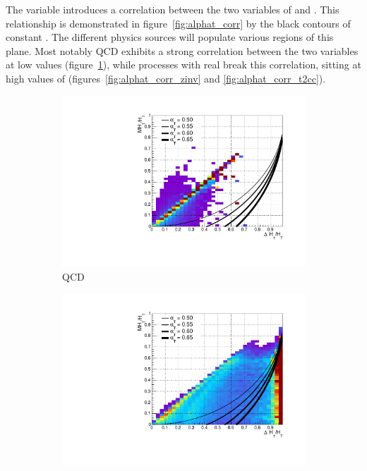 The \alphat variable introduces a correlation between the two variables of \mht
and \deltaHT. This relationship is demonstrated in figure~\ref{fig:alphat_corr}
by the black contours of constant \alphat. The different physics sources
will populate various regions of this plane. Most notably QCD exhibits a strong
correlation between the two variables at low \alphat values
(figure~\ref{fig:alphat_corr_qcd}), while processes with real \met break this
correlation, sitting at high values of \alphat (figures~\ref{fig:alphat_corr_zinv}
and \ref{fig:alphat_corr_t2cc}).

\begin{figure}[h!]
  \centering
  \begin{subfigure}[b]{.46\textwidth}
    \includegraphics[width=\textwidth]{Figs/alphat/alphat_correlation_QCD.pdf}
    \caption{QCD}
    \label{fig:alphat_corr_qcd}
  \end{subfigure}
  \begin{subfigure}[b]{.46\textwidth}
    \includegraphics[width=\textwidth]{Figs/alphat/alphat_correlation_Zinv.pdf}

\end{subfigure}
\end{figure}
